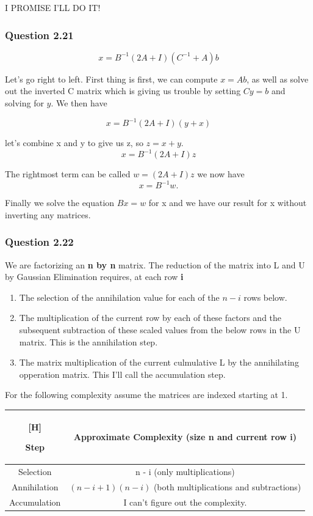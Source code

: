 \documentclass{article}
\begin{document}
{
\color{red} I PROMISE I'LL DO IT!
}

\subsubsection{Question 2.21}
$$x = B^{-1} (2A + I)(C^{-1} + A)b$$

Let's go right to left. First thing is first, we can compute $x = Ab$, as well as
solve out the inverted C matrix which is giving us trouble by setting $Cy = b$ and
solving for $y$. We then have

$$x = B^{-1} (2A + I)(y + x)$$

let's combine x and y to give us z, so $z = x + y$.
$$x = B^{-1} (2A + I)z$$

The rightmost term can be called $w  = (2A + I) z$ we now have
$$x = B^{-1} w.$$

Finally we solve the equation $Bx = w$ for x and we have our result for x without
inverting any matrices.

\subsubsection{Question 2.22}

We are factorizing an \textbf{n by n} matrix. The reduction of the matrix into L and U
by Gaussian Elimination requires, at each row \textbf{i}

\begin{enumerate}
\item The selection of the annihilation value for each of the $n-i$ rows below.
\item The multiplication of the current row by each of these factors and the subsequent subtraction 
of these scaled values from the below rows in the U matrix. This is the annihilation step.
\item The matrix multiplication of the current culmulative L by the annihilating opperation matrix. This I'll call the accumulation step.
\end{enumerate}

For the following complexity assume the matrices are indexed starting at 1.

\begin{flushleft}
\begin{tabular}{c | c}[H]

Step & Approximate Complexity (size n and current row i)\\
\hline
Selection & n - i (only multiplications)\\
Annihilation & $(n-i + 1)(n-i)$ (both multiplications and subtractions)\\
Accumulation & {\color{red}I can't figure out the complexity.}\\
\end{tabular}
\end{flushleft}
\end{document}

